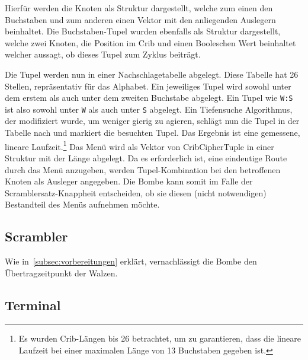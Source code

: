 Hierfür werden die Knoten als Struktur dargestellt, welche zum einen den Buchstaben und zum anderen einen Vektor mit den anliegenden Auslegern beinhaltet. 
Die Buchstaben-Tupel wurden ebenfalls als Struktur dargestellt, welche zwei Knoten, die Position im Crib und einen Booleschen Wert beinhaltet welcher aussagt, ob dieses Tupel zum Zyklus beiträgt.



\noindent

Die Tupel werden nun in einer \glqq Nachschlagetabelle\grqq{} abgelegt.
Diese Tabelle hat 26 Stellen, repräsentativ für das Alphabet.
Ein jeweiliges Tupel wird sowohl unter dem erstem als auch unter dem zweiten Buchstabe abgelegt. 
Ein Tupel wie \texttt{W:S} ist also sowohl unter \texttt{W} als auch unter \texttt{S} abgelegt.
Ein Tiefensuche Algorithmus, der modifiziert wurde, um weniger \glqq gierig\grqq{} zu agieren, schlägt nun die Tupel in der Tabelle nach und markiert die besuchten Tupel.
Das Ergebnis ist eine gemessene, lineare Laufzeit.\footnote{Es wurden Crib-Längen bis 26 betrachtet, um zu garantieren, dass die lineare Laufzeit bei einer maximalen Länge von 13 Buchstaben gegeben ist.} 
Das Menü wird als Vektor von \glqq CribCipherTuple\grqq{} in einer Struktur mit der Länge abgelegt.
Da es erforderlich ist, eine eindeutige \glqq Route\grqq{} durch das Menü anzugeben, werden Tupel-Kombination bei den betroffenen Knoten als Ausleger angegeben. 
Die Bombe kann somit im Falle der \glqq Scramblersatz-Knappheit\grqq{} entscheiden, ob sie diesen (nicht notwendigen) Bestandteil des Menüs aufnehmen möchte.

\subsection{Scrambler}\label{subsec:impl_scrambler}
Wie in~\cref{subsec:vorbereitungen} erklärt, vernachlässigt die Bombe den Übertragzeitpunkt der Walzen.

\subsection{Terminal}\label{subsec:impl_terminal}
